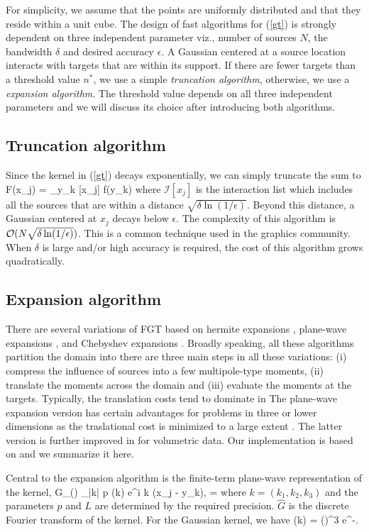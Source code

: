 For simplicity, we assume that the points are uniformly distributed and that they reside within a unit cube.
The design of fast algorithms for (\ref{gt}) is strongly dependent on three independent parameter viz., number of sources $N$, the bandwidth $\delta$ and desired accuracy $\epsilon$. A Gaussian centered at a source location interacts with targets that are within its support. If there are fewer targets than a threshold value $n^*$, we use a simple {\em truncation algorithm}, otherwise, we use a {\em expansion algorithm}. The threshold  value depends on all three independent parameters and we will discuss its choice after introducing both algorithms. 

\subsection{Truncation algorithm} 
Since the kernel in (\ref{gt}) decays exponentially, we can simply truncate the sum to
%
\beq F(x_j) = \sum_{y_k \in {}[x_j]}  f(y_k) \eeq
%
where $\mathcal{I}[x_j]$ is the interaction list which includes all the sources that are within a distance $\sqrt{\delta \ln (1/\epsilon)}$. Beyond this distance, a Gaussian centered at $x_j$ decays below $\epsilon$. The complexity of this algorithm is $\mathcal{O}(N \sqrt{\delta \ln(1/\epsilon)})$. This is a common technique used in the graphics community. When $\delta$ is large and/or high accuracy is required, the cost of this algorithm grows quadratically.  

\subsection{Expansion algorithm}
There are several variations of FGT based on hermite expansions \cite{fgt}, plane-wave expansions \cite{greengard98}, and Chebyshev expansions \cite{}. Broadly speaking, all these algorithms partition the domain into there are three main steps in all these variations: (i) compress the influence of sources into a few multipole-type moments, (ii) translate the moments across the domain and (iii) evaluate the moments at the targets. Typically, the translation costs tend to dominate in 
The plane-wave expansion version has certain advantages for problems in three or lower dimensions as the traslational cost is minimized to a large extent . The latter version is further improved in \cite{fggt} for volumetric data. Our implementation is based on \cite{fggt} and we summarize it here. 

Central to the expansion algorithm is the finite-term plane-wave representation of the kernel,
\beq G_\delta() \approx \sum_{|k| \leq p} (k) e^{i \lambda k \cdot (x_j - y_k)}, \quad \lambda = \eeq
where $k = (k_1, k_2, k_3)$ and the parameters $p$ and $L$ are determined by the required precision. $\hat{G}$ is the discrete Fourier transform of the kernel. For the Gaussian kernel, we have 
\beq {}(k) = \left(\right)^3 e^{-}.\eeq

